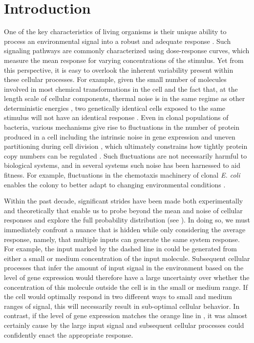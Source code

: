 \section{Introduction}

One of the key characteristics of living organisms is their unique ability to
process an environmental signal into a robust and adequate response
\cite{Nemenman2010}. Such signaling pathways are commonly characterized using
dose-response curves, which measure the mean response for varying concentrations
of the stimulus. Yet from this perspective, it is easy to overlook the inherent
variability present within these cellular processes. For example, given the
small number of molecules involved in most chemical transformations in the cell
and the fact that, at the length scale of cellular components, thermal noise is
in the same regime as other deterministic energies \cite{Phillips2006}, two
genetically identical cells exposed to the same stimulus will not have an
identical response \cite{Eldar2010}. Even in clonal populations of bacteria,
various mechanisms give rise to fluctuations in the number of protein produced
in a cell including the intrinsic noise in gene expression \cite{Elowitz2002}
and uneven partitioning during cell division \cite{Huh2011}, which ultimately
constrains how tightly protein copy numbers can be regulated \cite{Lestas2010}.
Such fluctuations are not necessarily harmful to biological systems, and in
several systems such noise has been harnessed to aid fitness. For example,
fluctuations in the chemotaxis machinery of clonal \textit{E. coli} enables the
colony to better adapt to changing environmental conditions \cite{Frankel2014}.

Within the past decade, significant strides have been made both experimentally
and theoretically that enable us to probe beyond the mean and noise of cellular
responses and explore the full probability distribution (see \fref[figExpSetup]).
In doing so, we must immediately confront a nuance that is hidden while
only considering the average response, namely, that multiple inputs can generate
the same system response. For example, the input marked by the dashed line in
\fref[figExpSetup] could be generated from either a small or medium
concentration of the input molecule. Subsequent cellular processes that infer
the amount of input signal in the environment based on the level of gene
expression would therefore have a large uncertainty over whether the
concentration of this molecule outside the cell is in the small or medium range.
If the cell would optimally respond in two different ways to small and medium
ranges of signal, this will necessarily result in sub-optimal cellular behavior.
In contrast, if the level of gene expression matches the orange line in
\fref[figExpSetup], it was almost certainly cause by the large input
signal and subsequent cellular processes could confidently enact the appropriate
response.

